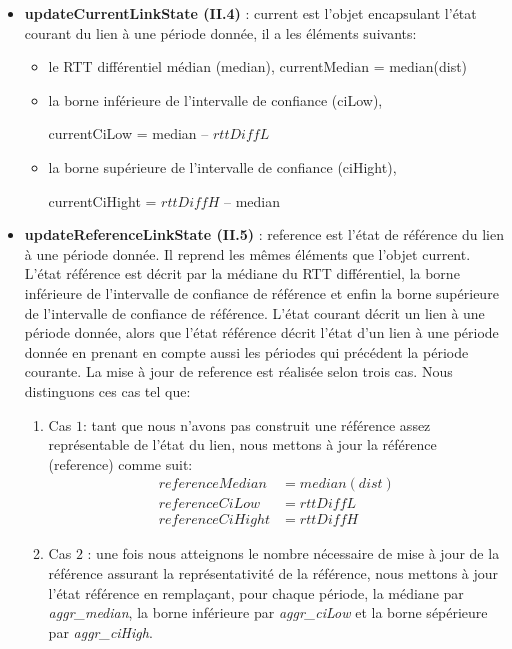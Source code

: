 \begin{itemize}
\begin{enumerate}
\end{enumerate}


 \item \textbf{updateCurrentLinkState (II.4)} :  {\color{gray}current}  est l'objet encapsulant  l'état courant du lien à une période donnée, il a
    les éléments suivants:
 
 \begin{itemize}[label=$\square$]
 	\item le RTT différentiel médian ({\color{gray}median}),
 	{\color{gray}currentMedian} = median(dist) 
 	
 	\item  la borne inférieure de l'intervalle de confiance ({\color{gray}ciLow}),
 	
 	{\color{gray}currentCiLow} = {\color{gray}median} --  $ rttDiffL $
 	
 	\item   la borne supérieure de l'intervalle de confiance ({\color{gray}ciHight}),
 	
 	{\color{gray}currentCiHight} =  $ rttDiffH$ --  {\color{gray}median}
 	
 \end{itemize}

\item \textbf{ updateReferenceLinkState (II.5)} :  {\color{gray}reference}  est l'état de référence du lien à une période donnée. Il reprend les mêmes éléments que  l'objet {\color{gray}current}.  L'état référence est décrit par la médiane du RTT différentiel, la borne inférieure de l'intervalle de confiance de référence et enfin la borne supérieure de l'intervalle de confiance de référence.
L'état courant décrit un lien à une période donnée, alors que l'état référence décrit l'état d'un lien à une période donnée en prenant en compte aussi les périodes qui précédent la période courante. La mise à jour de {\color{gray}reference}  est réalisée selon trois cas. Nous distinguons ces cas tel que:

\begin{enumerate}
	\item Cas $1$: tant que nous n'avons pas construit une référence assez représentable de l'état du lien,  nous mettons à jour la référence ({\color{gray}reference}) comme suit: 
	\begin{align}
	referenceMedian &= median(dist)\\
	referenceCiLow &= rttDiffL\\
	referenceCiHight& = rttDiffH
	\end{align}
	\item Cas $2$ : une fois nous atteignons le nombre nécessaire de  mise à jour de la référence assurant la représentativité de la référence, nous mettons à jour l'état référence en remplaçant, pour chaque période, la médiane par \textit{ aggr\_median}, la borne inférieure  par  \textit{aggr\_ciLow} et la borne sépérieure par \textit{aggr\_ciHigh}.
	\begin{itemize}
		

\end{itemize}
\end{enumerate}
\end{itemize}
